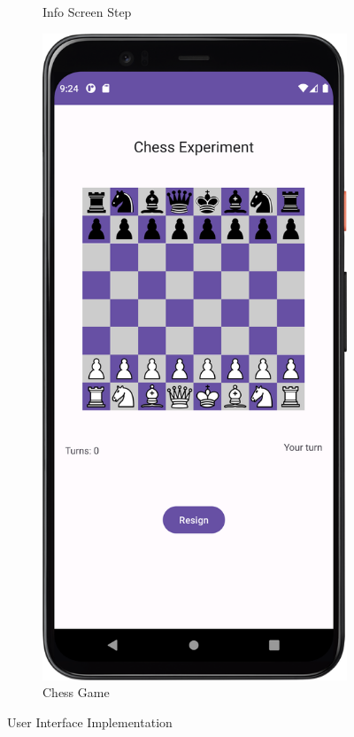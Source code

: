\begin{figure}[htbp]
\begin{subfigure}[b]{0.25\textwidth}
        \caption{Info Screen Step}
        \label{subfig:InfoScreen2}
    \end{subfigure}
    \hspace{1cm}
    \begin{subfigure}[b]{0.25\textwidth}
        \centering
        \includegraphics[width=\textwidth]{content/06_demonstration_of_the_artifact/Screenshot_Chess.png}
        \caption{Chess Game}
        \label{subfig:ChessGame}
    \end{subfigure}
    \caption{User Interface Implementation}
    \label{fig:uiScreens}
\end{figure}

